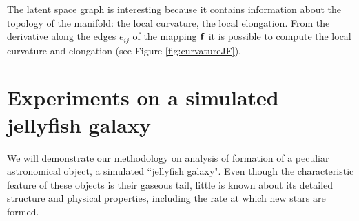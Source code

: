 The latent space graph is interesting because it contains information about the topology of the manifold: the local curvature, the local elongation.
From the derivative along the edges $e_{ij}$ of the mapping $\boldsymbol{\mathbf{f}}$ it is possible to compute the local curvature and elongation (see Figure \ref{fig:curvatureJF}).





\section{Experiments on a simulated jellyfish galaxy}\label{sec:Ex_JellyFish}

We will demonstrate our methodology on analysis of formation of a peculiar astronomical object, a simulated ``jellyfish galaxy".
Even though the characteristic feature of these objects is their gaseous tail, little is known about its detailed structure and physical properties, including the rate at which new stars are formed.

